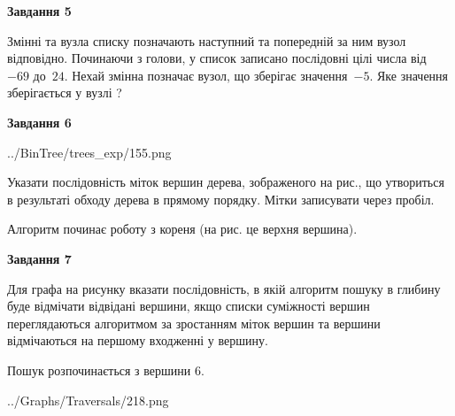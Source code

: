 \documentclass[12pt, ukrainian]{article}
\begin{document}
{\begin {large}
{\begin {center}\textbf{Завдання 5}\end {center}}\par
Змінні  та  вузла списку позначають наступний та попередній за ним вузол відповідно. Починаючи з голови, у список записано послідовні цілі числа від~$-69$ до~$24$. Нехай змінна  позначає вузол, що зберігає значення~$-5$.
Яке значення зберігається у вузлі  ?\par
\newpage

{\begin {center}\textbf{Завдання 6}\end {center}}\par

\begin{center}
	{../BinTree/trees_exp/155.png}
\end{center}
Указати послідовність міток вершин дерева, зображеного на рис., що утвориться в результаті обходу дерева в прямому порядку. Мітки записувати через пробіл.\par Алгоритм починає роботу з кореня (на рис. це верхня вершина).\par
\newpage

{\begin {center}\textbf{Завдання 7}\end {center}}\par
Для графа на рисунку вказати послідовність, в якій алгоритм пошуку в глибину буде відмічати відвідані вершини, якщо списки суміжності вершин переглядаються алгоритмом за зростанням міток вершин та вершини відмічаються на першому вход\-женні у вершину.\par
Пошук розпочинається з вершини 6.\par

\begin{center}
	{../Graphs/Traversals/218.png}
\end{center}\par
\newpage


\end{large}}
\end{document}
